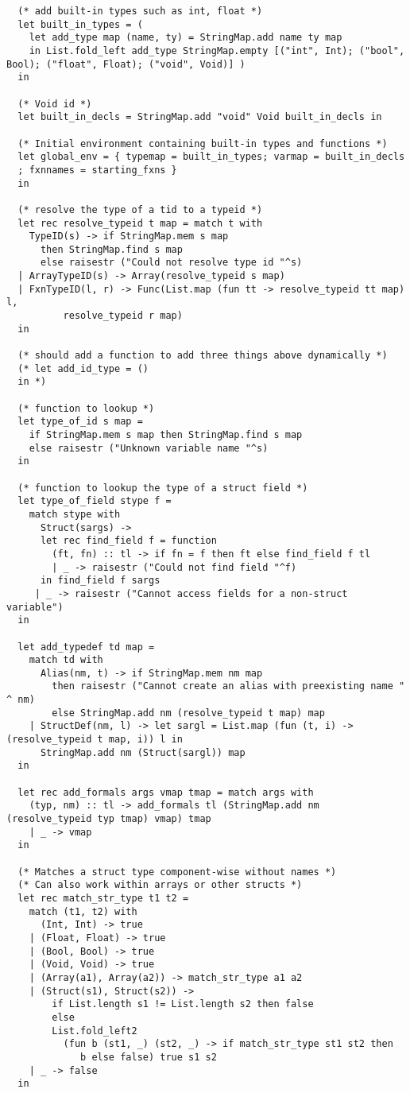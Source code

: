 \documentclass[main.tex]{subfiles}
\begin{document}
\begin{lstlisting}
  (* add built-in types such as int, float *)
  let built_in_types = (
    let add_type map (name, ty) = StringMap.add name ty map
    in List.fold_left add_type StringMap.empty [("int", Int); ("bool", Bool); ("float", Float); ("void", Void)] )
  in

  (* Void id *)
  let built_in_decls = StringMap.add "void" Void built_in_decls in

  (* Initial environment containing built-in types and functions *)
  let global_env = { typemap = built_in_types; varmap = built_in_decls 
  ; fxnnames = starting_fxns }
  in

  (* resolve the type of a tid to a typeid *)
  let rec resolve_typeid t map = match t with
    TypeID(s) -> if StringMap.mem s map
      then StringMap.find s map
      else raisestr ("Could not resolve type id "^s)
  | ArrayTypeID(s) -> Array(resolve_typeid s map)
  | FxnTypeID(l, r) -> Func(List.map (fun tt -> resolve_typeid tt map) l,
          resolve_typeid r map)
  in

  (* should add a function to add three things above dynamically *)
  (* let add_id_type = ()
  in *)

  (* function to lookup *)
  let type_of_id s map = 
    if StringMap.mem s map then StringMap.find s map
    else raisestr ("Unknown variable name "^s)
  in

  (* function to lookup the type of a struct field *)
  let type_of_field stype f = 
    match stype with
      Struct(sargs) -> 
      let rec find_field f = function
        (ft, fn) :: tl -> if fn = f then ft else find_field f tl
        | _ -> raisestr ("Could not find field "^f)
      in find_field f sargs
     | _ -> raisestr ("Cannot access fields for a non-struct variable")
  in

  let add_typedef td map =
    match td with
      Alias(nm, t) -> if StringMap.mem nm map
        then raisestr ("Cannot create an alias with preexisting name " ^ nm)
        else StringMap.add nm (resolve_typeid t map) map
    | StructDef(nm, l) -> let sargl = List.map (fun (t, i) -> (resolve_typeid t map, i)) l in
      StringMap.add nm (Struct(sargl)) map
  in

  let rec add_formals args vmap tmap = match args with
    (typ, nm) :: tl -> add_formals tl (StringMap.add nm (resolve_typeid typ tmap) vmap) tmap
    | _ -> vmap
  in

  (* Matches a struct type component-wise without names *)
  (* Can also work within arrays or other structs *)
  let rec match_str_type t1 t2 =
    match (t1, t2) with
      (Int, Int) -> true
    | (Float, Float) -> true
    | (Bool, Bool) -> true
    | (Void, Void) -> true
    | (Array(a1), Array(a2)) -> match_str_type a1 a2
    | (Struct(s1), Struct(s2)) -> 
        if List.length s1 != List.length s2 then false
        else
        List.fold_left2
          (fun b (st1, _) (st2, _) -> if match_str_type st1 st2 then
             b else false) true s1 s2
    | _ -> false
  in


\end{lstlisting}
\end{document}
